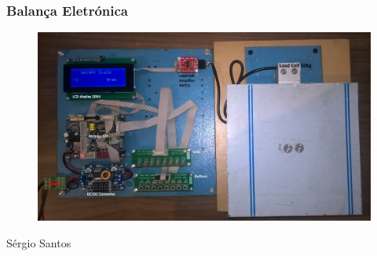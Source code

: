 \begin{frame}
\frametitle{Balança Eletrónica}
\begin{minipage}{\linewidth}
	\begin{figure}[ht]
		\begin{center}
			\includegraphics[scale=0.1]{./image/PESTA/kit/Kit_Desenvolvimento_2}
		\end{center}
	\end{figure}
\end{minipage}
\newline
\vfill
\hfill {\tiny Sérgio Santos}
\end{frame}
